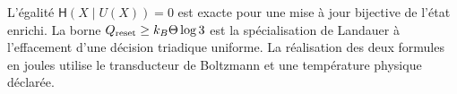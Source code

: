 \begin{statusbox}[title={Portée du coût de Landauer nul}]
L’égalité \(\mathsf H(X\mid U(X))=0\) est exacte pour une mise à jour bijective de l’état enrichi. La borne \(Q_{\rm reset}\ge k_B\Theta\log3\) est la spécialisation de Landauer à l’effacement d’une décision triadique uniforme. La réalisation des deux formules en joules utilise le transducteur de Boltzmann et une température physique déclarée.
\end{statusbox}
